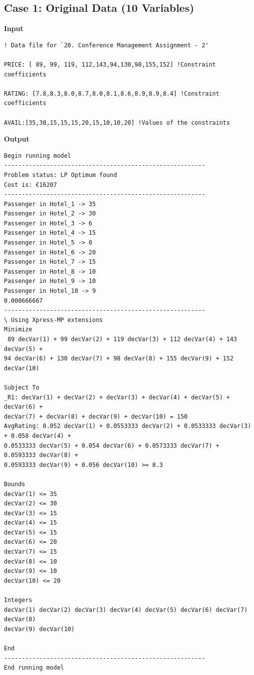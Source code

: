 \documentclass[paper=a4, fontsize=11pt]{scrartcl} %
\begin{document}
\subsection{Case 1: Original Data (10 Variables)}
\textbf{Input}
\begin{verbatim}
! Data file for `20. Conference Management Assignment - 2'

PRICE: [ 89, 99, 119, 112,143,94,130,98,155,152] !Constraint coefficients	 	

RATING: [7.8,8.3,8.0,8.7,8.0,8.1,8.6,8.9,8.9,8.4] !Constraint coefficients

AVAIL:[35,30,15,15,15,20,15,10,10,20] !Values of the constraints
\end{verbatim}
\textbf{Output}
\begin{verbatim}
Begin running model
---------------------------------------------------------
Problem status: LP Optimum found
Cost is: €16207
---------------------------------------------------------
Passenger in Hotel_1 -> 35
Passenger in Hotel_2 -> 30
Passenger in Hotel_3 -> 6
Passenger in Hotel_4 -> 15
Passenger in Hotel_5 -> 0
Passenger in Hotel_6 -> 20
Passenger in Hotel_7 -> 15
Passenger in Hotel_8 -> 10
Passenger in Hotel_9 -> 10
Passenger in Hotel_10 -> 9
0.000666667
---------------------------------------------------------
\ Using Xpress-MP extensions
Minimize
 89 decVar(1) + 99 decVar(2) + 119 decVar(3) + 112 decVar(4) + 143 decVar(5) + 
94 decVar(6) + 130 decVar(7) + 98 decVar(8) + 155 decVar(9) + 152 decVar(10)

Subject To
_R1: decVar(1) + decVar(2) + decVar(3) + decVar(4) + decVar(5) + decVar(6) + 
decVar(7) + decVar(8) + decVar(9) + decVar(10) = 150
AvgRating: 0.052 decVar(1) + 0.0553333 decVar(2) + 0.0533333 decVar(3) + 0.058 decVar(4) + 
0.0533333 decVar(5) + 0.054 decVar(6) + 0.0573333 decVar(7) + 0.0593333 decVar(8) + 
0.0593333 decVar(9) + 0.056 decVar(10) >= 8.3

Bounds
decVar(1) <= 35
decVar(2) <= 30
decVar(3) <= 15
decVar(4) <= 15
decVar(5) <= 15
decVar(6) <= 20
decVar(7) <= 15
decVar(8) <= 10
decVar(9) <= 10
decVar(10) <= 20

Integers
decVar(1) decVar(2) decVar(3) decVar(4) decVar(5) decVar(6) decVar(7) decVar(8) 
decVar(9) decVar(10) 

End
---------------------------------------------------------
End running model
\end{verbatim}
\end{document}
